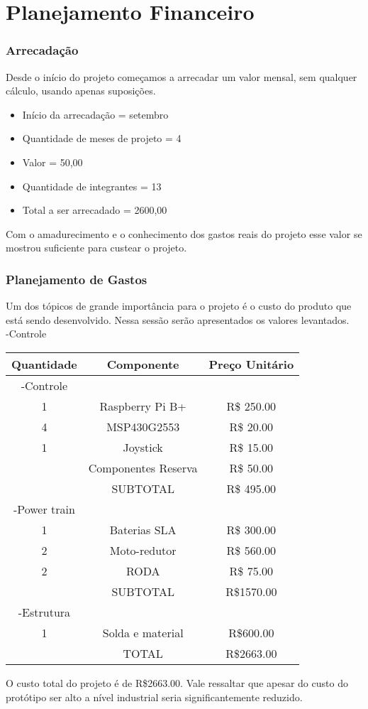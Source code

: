 \chapter[Planejamento Financeiro]{Planejamento Financeiro}
\subsection {Arrecadação}
Desde o início do projeto começamos a arrecadar um valor mensal, sem qualquer cálculo, usando apenas suposições.
  \begin{itemize}
    \item Início da arrecadação = setembro
    \item Quantidade de meses de projeto = 4
    \item Valor = 50,00
    \item Quantidade de integrantes = 13
    \item Total a ser arrecadado = 2600,00

  \end{itemize}
Com o amadurecimento e o conhecimento dos gastos reais do projeto esse valor se mostrou suficiente para custear o projeto.

\subsection {Planejamento de Gastos}
Um dos tópicos de grande importância para o projeto é o custo do produto que está sendo desenvolvido. Nessa sessão serão apresentados os valores levantados.\\
-Controle


\begin{center}
\begin{tabular}{ |c|c|c| }
 \hline
Quantidade & Componente & Preço Unitário\\
 \hline
-Controle &  & \\
 1 & Raspberry Pi B+   &  R\$ 250.00 \\
 4 & MSP430G2553  & R\$ 20.00 \\
 1 & Joystick  & R\$ 15.00 \\
 & Componentes Reserva & R\$ 50.00\\
& SUBTOTAL & R\$ 495.00\\
-Power train &  & \\
1& Baterias SLA  & R\$ 300.00\\
2 & Moto-redutor&  R\$ 560.00\\
2& RODA & R\$ 75.00\\
& SUBTOTAL &  R\$1570.00\\
-Estrutura &  & \\
1 &  Solda e material & R\$600.00\\

 \hline
& TOTAL &  R\$2663.00\\
 \hline
\end{tabular}
\end{center}

O custo total do projeto é de R\$2663.00.  Vale ressaltar que apesar do custo do protótipo ser alto a nível industrial seria significantemente reduzido.
